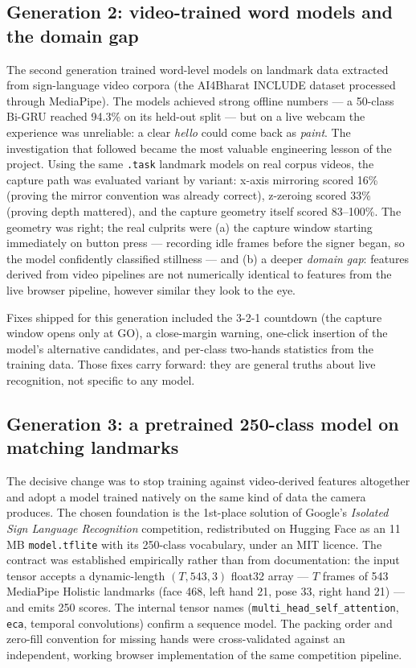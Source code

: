 \documentclass[11pt,a4paper]{article}
\newcommand{\code}[1]{\texttt{#1}}
\begin{document}
\subsection{Generation 2: video-trained word models and the domain gap}

The second generation trained word-level models on landmark data extracted from sign-language video corpora (the AI4Bharat INCLUDE dataset processed through MediaPipe). The models achieved strong offline numbers --- a 50-class Bi-GRU reached 94.3\% on its held-out split --- but on a live webcam the experience was unreliable: a clear \emph{hello} could come back as \emph{paint}. The investigation that followed became the most valuable engineering lesson of the project. Using the same \code{.task} landmark models on real corpus videos, the capture path was evaluated variant by variant: x-axis mirroring scored 16\% (proving the mirror convention was already correct), z-zeroing scored 33\% (proving depth mattered), and the capture geometry itself scored 83--100\%. The geometry was right; the real culprits were (a) the capture window starting immediately on button press --- recording idle frames before the signer began, so the model confidently classified stillness --- and (b) a deeper \emph{domain gap}: features derived from video pipelines are not numerically identical to features from the live browser pipeline, however similar they look to the eye.

Fixes shipped for this generation included the 3-2-1 countdown (the capture window opens only at GO), a close-margin warning, one-click insertion of the model's alternative candidates, and per-class two-hands statistics from the training data. Those fixes carry forward: they are general truths about live recognition, not specific to any model.

\subsection{Generation 3: a pretrained 250-class model on matching landmarks}

The decisive change was to stop training against video-derived features altogether and adopt a model trained natively on the same kind of data the camera produces. The chosen foundation is the 1st-place solution of Google's \emph{Isolated Sign Language Recognition} competition, redistributed on Hugging Face as an 11\,MB \code{model.tflite} with its 250-class vocabulary, under an MIT licence. The contract was established empirically rather than from documentation: the input tensor accepts a dynamic-length $(T, 543, 3)$ float32 array --- $T$ frames of 543 MediaPipe Holistic landmarks (face 468, left hand 21, pose 33, right hand 21) --- and emits 250 scores. The internal tensor names (\code{multi\_head\_self\_attention}, \code{eca}, temporal convolutions) confirm a sequence model. The packing order and zero-fill convention for missing hands were cross-validated against an independent, working browser implementation of the same competition pipeline.
\end{document}

